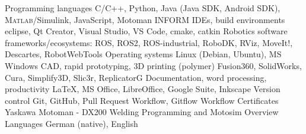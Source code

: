 
\begin{cvskills}
  \cvskill
    {Programming languages}
    {C/C++, Python, Java (Java SDK, Android SDK), \textsc{Matlab}/Simulink, JavaScript, \newline Motoman INFORM}
  \cvskill
    {IDEs, build environments}
    {eclipse, Qt Creator, Visual Studio, VS Code, cmake, catkin}
  \cvskill
    {Robotics software frameworks/ecosystems:}
    {ROS, ROS2, ROS-industrial, RoboDK, RViz, MoveIt!, Descartes, RobotWebTools}
  \cvskill
    {Operating systems}
    {Linux (Debian, Ubuntu), MS Windows}
  \cvskill
    {CAD, rapid prototyping, 3D printing (polymer)}
    {Fusion360, SolidWorks, Cura, Simplify3D, Slic3r, ReplicatorG}
  \cvskill
    {Documentation, word processing, productivity}
    {\LaTeX, MS Office, LibreOffice, Google Suite, Inkscape}
  \cvskill
    {Version control}
    {Git, GitHub, Pull Request Workflow, Gitflow Workflow}
  \cvskill
    {Certificates}
    {Yaskawa Motoman - DX200 Welding Programming and Motosim Overview}
  \cvskill
    {Languages}
    {German (native), English}

\end{cvskills}
